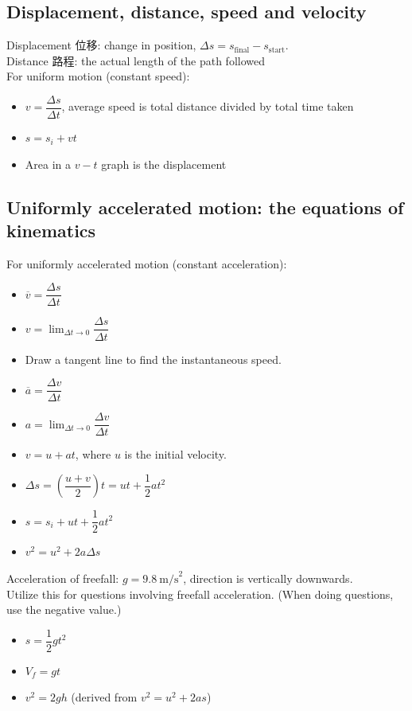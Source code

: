 \documentclass[a4paper,12pt]{article}
\begin{document}
\subsection{Displacement, distance, speed and velocity}
Displacement 位移: change in position, $\Delta s=s_{\text{final}}-s_{\text{start}}$.\\
Distance 路程: the actual length of the path followed\\
For uniform motion (constant speed):
\begin{itemize}
  \item $v=\dfrac{\Delta s}{\Delta t}$, average speed is total distance divided by total time taken
  \item $s=s_i+vt$
  \item Area in a $v-t$ graph is the displacement
\end{itemize}
\subsection{Uniformly accelerated motion: the equations of kinematics}
For uniformly accelerated motion (constant acceleration):
\begin{itemize}
  \item $\overline{v}=\dfrac{\Delta s}{\Delta t}$
  \item $\displaystyle v=\lim_{\Delta t \to 0}\dfrac{\Delta s}{\Delta t}$
  \item Draw a tangent line to find the instantaneous speed.
  \item $\overline{a}=\dfrac{\Delta v}{\Delta t}$
  \item $\displaystyle a=\lim_{\Delta t \to 0}\dfrac{\Delta v}{\Delta t}$
  \item $v=u+at$, where $u$ is the initial velocity.
  \item $\Delta s=\left(\dfrac{u+v}{2}\right)t=ut+\dfrac{1}{2}at^2$
  \item $s=s_i+ut+\dfrac{1}{2}at^2$
  \item $v^2=u^2+2a\Delta s$
\end{itemize}
Acceleration of freefall: $g=9.8\ \text{m/s}^2$, direction is vertically downwards.\\
Utilize this for questions involving freefall acceleration. (When doing questions, use the negative value.)
\begin{itemize}
\item $s=\dfrac{1}{2}gt^2$
\item $V_f=gt$
\item $v^2=2gh$ (derived from $v^2=u^2+2as$)
\end{itemize}
\end{document}
